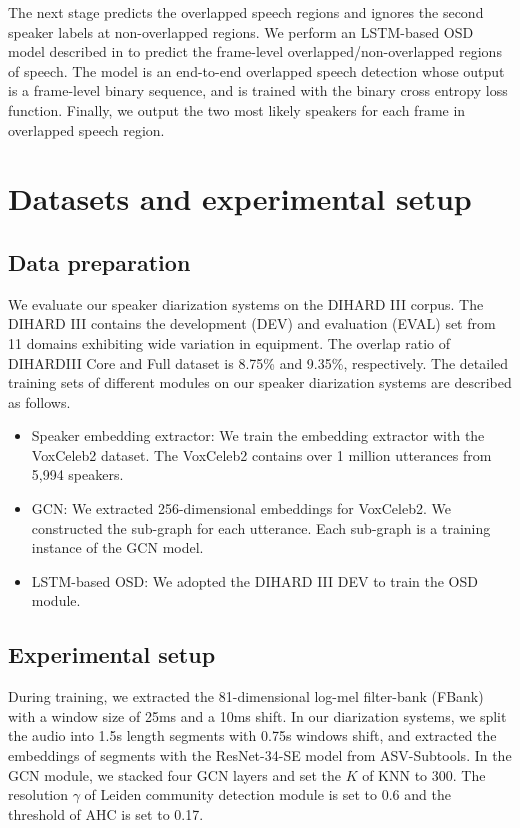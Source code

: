 \documentclass[10pt]{article}
\begin{document}
The next stage predicts the overlapped speech regions and ignores the second speaker labels at non-overlapped regions. We perform an LSTM-based OSD model described in \cite{Bredin2021} to predict the frame-level overlapped/non-overlapped regions of speech. The model is an end-to-end overlapped speech detection whose output is a frame-level binary sequence, and is trained with the binary cross entropy loss function. Finally, we output the two most likely speakers for each frame in overlapped speech region.

\section{Datasets and experimental setup}
\subsection{Data preparation}
We evaluate our speaker diarization systems on the DIHARD III corpus. The DIHARD III contains the development (DEV) and evaluation (EVAL) set from 11 domains exhibiting wide variation in equipment. The overlap ratio of DIHARDIII Core and Full dataset is 8.75\% and 9.35\%, respectively. The detailed training sets of different modules on our speaker diarization systems are described as follows.
\label{sec:data}
\begin{itemize}[leftmargin=*]
\item Speaker embedding extractor: We train the embedding extractor with the VoxCeleb2 dataset. The VoxCeleb2 contains over 1 million utterances from 5,994 speakers. 
\item GCN: We extracted 256-dimensional embeddings for VoxCeleb2. We constructed the sub-graph for each utterance. Each sub-graph is a training instance of the GCN model.

\item LSTM-based OSD: We adopted the DIHARD III DEV to train the OSD module. 
\end{itemize}
\subsection{Experimental setup}
 During training, we extracted the 81-dimensional log-mel filter-bank (FBank) with a window size of 25ms and a 10ms shift. In our diarization systems, we split the audio into 1.5s length segments with 0.75s windows shift, and extracted the embeddings of segments with the ResNet-34-SE model from ASV-Subtools\cite{tong2021asv}. In the GCN module, we stacked four GCN layers and set the $K$ of KNN to 300. The resolution $\gamma$ of Leiden community detection module is set to 0.6 and the threshold of AHC is set to 0.17.
\end{document}
